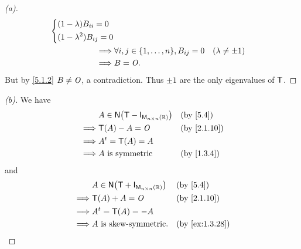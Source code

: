 \begin{proof}[(a)]
\begin{align*}
\begin{dcases}
                                                     (1 - \lambda) B_{i i} = 0 \\
                                                     (1 - \lambda^2) B_{i j} = 0
                                                   \end{dcases}                                 \\
    \implies & \forall i, j \in \set{1, \dots, n}, B_{i j} = 0               &  & (\lambda \neq \pm 1)        \\
    \implies & B = \zm.
  \end{align*}
  But by \cref{5.1.2} \(B \neq \mathit{O}\), a contradiction.
  Thus \(\pm 1\) are the only eigenvalues of \(\mathsf{T}\).
\end{proof}

\begin{proof}[(b)]
  We have
  \begin{align*}
             & A \in \ns{\T - \IT[\ms{n}{n}{\R}]} &  & \text{(by \cref{5.4})}    \\
    \implies & \T(A) - A = \zm                    &  & \text{(by \cref{2.1.10})} \\
    \implies & \tp{A} = \T(A) = A                                                \\
    \implies & A \text{ is symmetric}             &  & \text{(by \cref{1.3.4})}
  \end{align*}
  and
  \begin{align*}
             & A \in \ns{\T + \IT[\ms{n}{n}{\R}]} &  & \text{(by \cref{5.4})}       \\
    \implies & \T(A) + A = \zm                    &  & \text{(by \cref{2.1.10})}    \\
    \implies & \tp{A} = \T(A) = -A                                                  \\
    \implies & A \text{ is skew-symmetric}.       &  & \text{(by \cref{ex:1.3.28})}
  \end{align*}
\end{proof}

